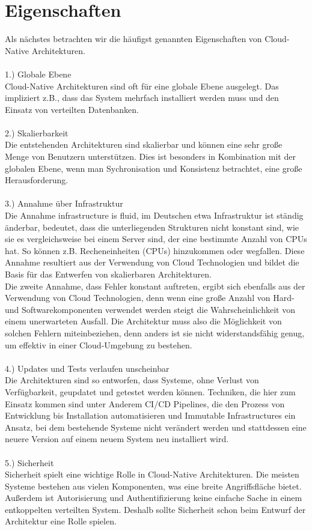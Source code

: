 \section{Eigenschaften}
Als nächstes betrachten wir die häufigst genannten Eigenschaften von Cloud-Native Architekturen.\\
\\
1.) Globale Ebene\\
Cloud-Native Architekturen sind oft für eine globale Ebene ausgelegt. Das impliziert z.B., dass das System mehrfach installiert werden muss und den Einsatz von verteilten Datenbanken.\\
\\
2.) Skalierbarkeit\\
Die entstehenden Architekturen sind skalierbar und können eine sehr große Menge von Benutzern unterstützen. Dies ist besonders in Kombination mit der globalen Ebene, wenn man Sychronisation und Konsistenz betrachtet, eine große Herausforderung.\\
\\
3.) Annahme über Infrastruktur\\
Die Annahme \glqq infrastructure is fluid\grqq{}, im Deutschen etwa Infrastruktur ist ständig änderbar, bedeutet, dass die unterliegenden Strukturen nicht konstant sind, wie sie es vergleichsweise bei einem Server sind, der eine bestimmte Anzahl von CPUs hat. So können z.B. Recheneinheiten (CPUs) hinzukommen oder wegfallen. Diese Annahme resultiert aus der Verwendung von Cloud Technologien und bildet die Basis für das Entwerfen von skalierbaren Architekturen.\\
Die zweite Annahme, dass Fehler konstant auftreten, ergibt sich ebenfalls aus der Verwendung von Cloud Technologien, denn wenn eine große Anzahl von Hard- und Softwarekomponenten verwendet werden steigt die Wahrscheinlichkeit von einem unerwarteten Ausfall. Die Architektur muss also die Möglichkeit von solchen Fehlern miteinbeziehen, denn anders ist sie nicht widerstandsfähig genug, um effektiv in einer Cloud-Umgebung zu bestehen.\\
\\
4.) Updates und Tests verlaufen unscheinbar\\
Die Architekturen sind so entworfen, dass Systeme, ohne Verlust von Verfügbarkeit, geupdatet und getestet werden können. Techniken, die hier zum Einsatz kommen sind unter Anderem CI/CD Pipelines, die den Prozess von Entwicklung bis Installation automatisieren und Immutable Infrastructures ein Ansatz, bei dem bestehende Systeme nicht verändert werden und stattdessen eine neuere Version auf einem neuem System neu installiert wird.\\
\\
5.) Sicherheit\\
Sicherheit spielt eine wichtige Rolle in Cloud-Native Architekturen. Die meisten Systeme bestehen aus vielen Komponenten, was eine breite Angriffsfläche bietet. Außerdem ist Autorisierung und Authentifizierung keine einfache Sache in einem entkoppelten verteilten System. Deshalb sollte Sicherheit schon beim Entwurf der Architektur eine Rolle spielen.

